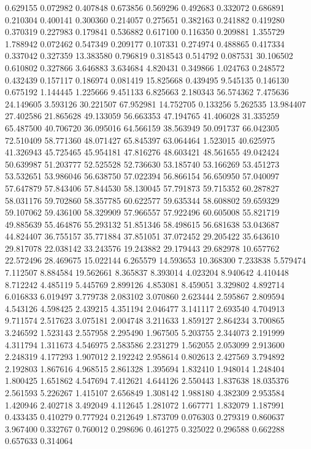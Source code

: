 0.629155
0.072982
0.407848
0.673856
0.569296
0.492683
0.332072
0.686891
0.210304
0.400141
0.300360
0.214057
0.275651
0.382163
0.241882
0.419280
0.370319
0.227983
0.179841
0.536882
0.617100
0.116350
0.209881
1.355729
1.788942
0.072462
0.547349
0.209177
0.107331
0.274974
0.488865
0.417334
0.337042
0.327359
13.383580
0.796819
0.318543
0.514792
0.087531
30.106502
0.610802
0.327866
3.646883
3.634684
4.820431
0.349866
1.024763
0.248572
0.432439
0.157117
0.186974
0.081419
15.825668
0.439495
9.545135
0.146130
0.675192
1.144445
1.225666
9.451133
6.825663
2.180343
56.574362
7.475636
24.149605
3.593126
30.221507
67.952981
14.752705
0.133256
5.262535
13.984407
27.402586
21.865628
49.133059
56.663353
47.194765
41.406028
31.335259
65.487500
40.706720
36.095016
64.566159
38.563949
50.091737
66.042305
72.510409
58.771360
48.071427
65.845397
63.064464
1.523015
40.625975
41.326943
45.725465
45.954181
47.816276
48.603421
48.561655
49.042424
50.639987
51.203777
52.525528
52.736630
53.185740
53.166269
53.451273
53.532651
53.986046
56.638750
57.022394
56.866154
56.650950
57.040097
57.647879
57.843406
57.844530
58.130045
57.791873
59.715352
60.287827
58.031176
59.702860
58.357785
60.622577
59.635344
58.608802
59.659329
59.107062
59.436100
58.329909
57.966557
57.922496
60.605008
55.821719
49.885639
55.464876
55.293132
51.851346
58.498615
56.681638
53.043687
44.824407
36.755157
35.771884
37.851051
37.072452
29.205422
35.643610
29.817078
22.038142
33.243576
19.243882
29.179443
29.682978
10.657762
22.572496
28.469675
15.022144
6.265579
14.593653
10.368300
7.233838
5.579474
7.112507
8.884584
19.562661
8.365837
8.393014
4.023204
8.940642
4.410448
8.712242
4.485119
5.445769
2.899126
4.853081
8.459051
3.329802
4.892714
6.016833
6.019497
3.779738
2.083102
3.070860
2.623444
2.595867
2.809594
4.543126
4.598425
2.439215
4.351194
2.046477
3.141117
2.693540
4.704913
9.711574
2.517623
3.075181
2.004748
3.211633
1.859127
2.864234
3.700865
3.246592
1.523143
2.557958
2.295490
1.967505
5.203755
2.344073
2.191999
4.311794
1.311673
4.546975
2.583586
2.231279
1.562055
2.053099
2.913600
2.248319
4.177293
1.907012
2.192242
2.958614
0.802613
2.427569
3.794892
2.192803
1.867616
4.968515
2.861328
1.395694
1.832410
1.948014
1.248404
1.800425
1.651862
4.547694
7.412621
4.644126
2.550443
1.837638
18.035376
2.561593
5.226267
1.415107
2.656849
1.308142
1.988180
4.382309
2.953584
1.420946
2.402718
3.492049
4.112645
1.281072
1.667771
1.832079
1.187991
0.433435
0.410279
0.777924
0.212649
1.873709
0.076303
0.279319
0.860637
3.967400
0.332767
0.760012
0.298696
0.461275
0.325022
0.296588
0.662288
0.657633
0.314064
